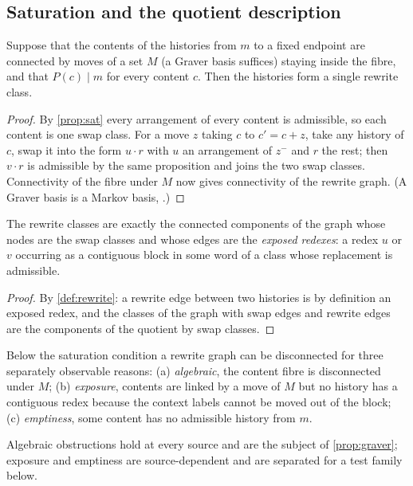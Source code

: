 \subsection{Saturation and the quotient description}
\begin{theorem}[saturation]\label{thm:saturation}
Suppose that the contents of the histories from $m$ to a fixed endpoint are connected by moves of a set $M$ (a Graver basis suffices) staying inside the fibre, and that $P(c)\mid m$ for every content $c$. Then the histories form a single rewrite class.
\end{theorem}
\begin{proof}
By \cref{prop:sat} every arrangement of every content is admissible, so each content is one swap class. For a move $z$ taking $c$ to $c'=c+z$, take any history of $c$, swap it into the form $u\cdot r$ with $u$ an arrangement of $z^-$ and $r$ the rest; then $v\cdot r$ is admissible by the same proposition and joins the two swap classes. Connectivity of the fibre under $M$ now gives connectivity of the rewrite graph. (A Graver basis is a Markov basis, \cite{Sturmfels1996,DiaconisSturmfels1998}.)
\end{proof}
\begin{proposition}\label{prop:quotient}
The rewrite classes are exactly the connected components of the graph whose nodes are the swap classes and whose edges are the \emph{exposed redexes}: a redex $u$ or $v$ occurring as a contiguous block in some word of a class whose replacement is admissible.
\end{proposition}
\begin{proof}
By \cref{def:rewrite}: a rewrite edge between two histories is by definition an exposed redex, and the classes of the graph with swap edges and rewrite edges are the components of the quotient by swap classes.
\end{proof}
\begin{corollary}\label{cor:trichotomy}
Below the saturation condition a rewrite graph can be disconnected for three separately observable reasons: (a) \emph{algebraic}, the content fibre is disconnected under $M$; (b) \emph{exposure}, contents are linked by a move of $M$ but no history has a contiguous redex because the context labels cannot be moved out of the block; (c) \emph{emptiness}, some content has no admissible history from $m$.
\end{corollary}
Algebraic obstructions hold at every source and are the subject of \cref{prop:graver}; exposure and emptiness are source-dependent and are separated for a test family below.

